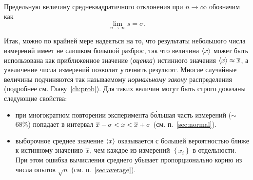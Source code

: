 Предельную величину среднеквадратичного отклонения при $n\to\infty$
обозначим как
\[
\lim\limits _{n\to\infty}s = \sigma.
\]




Итак, можно по крайней мере надеяться на то, что результаты небольшого числа
измерений имеет не слишком большой разброс, так что величина $\left<x\right>$
может быть использована как приближенное значение (\emph{оценка}) истинного значения
$\left<x\right>\approx \overline{x}$,
а увеличение числа измерений позволит уточнить результат.
Многие случайные величины подчиняются так называемому \emph{нормальному закону}
распределения (подробнее см. Главу~\ref{ch:prob}). Для таких величин
могут быть строго доказаны следующие свойства:
\begin{itemize}
    \item при многократном повторении эксперимента б\'{о}льшая часть измерений
    ($\sim$68\%) попадает в интервал $\overline{x}-\sigma<x<
    \overline{x}+\sigma$
    (см. п.~\ref{sec:normal}).
    \item выборочное среднее значение $\left<x\right>$ оказывается с большей
    вероятностью ближе к истинному значению $\overline{x}$, чем каждое из измерений
    $\left\{x_i\right\}$ в отдельности. При этом ошибка вычисления среднего
    убывает пропорционально корню из числа опытов $\sqrt{n}$
    (см. п.~\ref{sec:average}).
\end{itemize}

%

